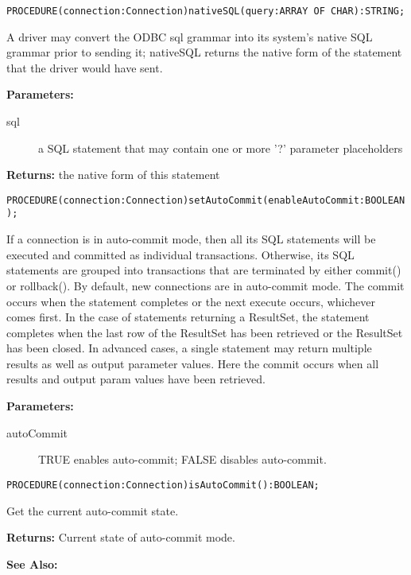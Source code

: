 
\verb'PROCEDURE(connection:Connection)nativeSQL(query:ARRAY OF CHAR):STRING;'

     A driver may convert the ODBC sql grammar into its system's native SQL grammar prior to sending it; nativeSQL returns the
     native form of the statement that the driver would have sent. 

     {\bf Parameters:} 
\begin{description}
\item[sql] a SQL statement that may contain one or more '?' parameter placeholders 
\end{description}

     {\bf Returns:} 
          the native form of this statement 


\verb'PROCEDURE(connection:Connection)setAutoCommit(enableAutoCommit:BOOLEAN);'

     If a connection is in auto-commit mode, then all its SQL statements will be executed and committed as individual transactions.
     Otherwise, its SQL statements are grouped into transactions that are terminated by either commit() or rollback(). By default, new
     connections are in auto-commit mode. The commit occurs when the statement completes or the next execute occurs,
     whichever comes first. In the case of statements returning a ResultSet, the statement completes when the last row of the
     ResultSet has been retrieved or the ResultSet has been closed. In advanced cases, a single statement may return multiple
     results as well as output parameter values. Here the commit occurs when all results and output param values have been
     retrieved. 

     {\bf Parameters:} 
\begin{description}
\item[autoCommit] TRUE enables auto-commit; FALSE disables auto-commit. 
\end{description}


\verb'PROCEDURE(connection:Connection)isAutoCommit():BOOLEAN;'

     Get the current auto-commit state. 

     {\bf Returns:}
          Current state of auto-commit mode. 

     {\bf See Also:} 


